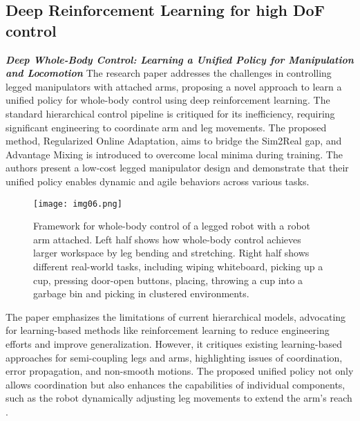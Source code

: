 \subsection{Deep Reinforcement Learning for high DoF control}

\textbf{\textit{Deep Whole-Body Control: Learning a Unified Policy
		for Manipulation and Locomotion}} \quad
The research paper \cite{fu2022deeplegged} addresses the challenges in controlling legged
manipulators with attached arms, proposing a novel approach to learn a unified policy for
whole-body control using deep reinforcement learning. The standard hierarchical control pipeline
is critiqued for its inefficiency, requiring significant engineering to coordinate
arm and leg movements. The proposed method, Regularized Online Adaptation, aims to bridge the Sim2Real gap,
and Advantage Mixing is introduced to overcome local minima during training.
The authors present a low-cost legged manipulator design and demonstrate that their
unified policy enables dynamic and agile behaviors across various tasks.

\begin{figure}[H]
	\centering
	\texttt{[image: img06.png]}
	\captionsetup{width=1\linewidth}
	\caption{Framework for whole-body control of a legged robot with a robot arm attached.
		Left half shows how whole-body control achieves larger workspace by leg bending and stretching.
		Right half shows different real-world tasks, including wiping whiteboard, picking up a cup,
		pressing door-open buttons, placing, throwing a cup into a garbage bin and picking
		in clustered environments. \cite{fu2022deeplegged}}
	\label{fig:img06}
\end{figure}

The paper emphasizes the limitations of current hierarchical models, advocating for learning-based
methods like reinforcement learning to reduce engineering efforts and improve generalization.
However, it critiques existing learning-based approaches for semi-coupling legs and arms,
highlighting issues of coordination, error propagation, and non-smooth motions.
The proposed unified policy not only allows coordination but also enhances the capabilities
of individual components, such as the robot dynamically adjusting leg movements to extend
the arm's reach \cite{fu2022deeplegged}.

